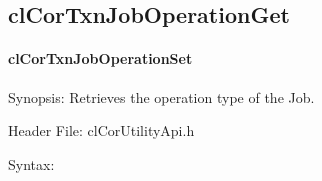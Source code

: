 \begin{flushleft}
\subsection{clCorTxnJobOperationGet}
\hypertarget{pagecor204}{}\paragraph{cl\-Cor\-Txn\-Job\-Operation\-Set}\label{pagecor204}
\begin{Desc}
\item[Synopsis:] Retrieves the operation type of the Job.
\end{Desc}
\begin{Desc}
\item[Header File:]clCorUtilityApi.h\end{Desc}
\begin{Desc}
\item[Syntax:]


\end{Desc}
\end{flushleft}
